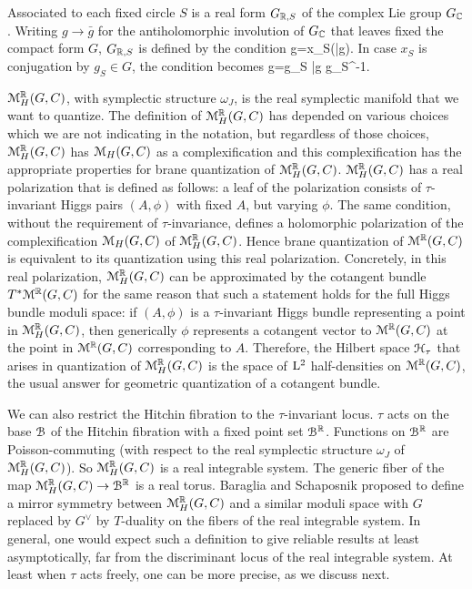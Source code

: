 \documentclass[11pt,a4paper]{article}
\begin{document}
  Associated to each fixed circle $S$ is a real form $G_{{\mathbb{R}},S}$ of the complex Lie group $G_{\mathbb C}$.   Writing $g\to \bar g$ for the antiholomorphic
  involution of $G_{\mathbb C}$ that leaves fixed the compact form $G$,  $G_{{\mathbb{R}},S}$ is defined by the condition
  \be\label{ralform} g=x_S(\bar g). \ee
  In case $x_S$ is conjugation by $g_S\in G$, the condition becomes 
  \be\label{realform} g=g_S \bar g g_S^{-1}.\ee

${\mathcal M}_H^{\mathbb{R}}(G,C)$, with symplectic structure $\omega_J$, is the real symplectic manifold  that we want to quantize.  The definition of  ${\mathcal M}_H^{\mathbb{R}}(G,C)$ has
depended on various choices which we are not indicating in the notation, but regardless of those choices, ${\mathcal M}_H^{\mathbb{R}}(G,C)$ has  ${\mathcal M}_H(G,C)$  as a complexification
and this complexification has the appropriate properties for brane quantization of ${\mathcal M}_H^{\mathbb{R}}(G,C)$.
${\mathcal M}_H^{\mathbb{R}}(G,C)$ has a real polarization that is defined
as follows: a leaf of the polarization consists of $\tau$-invariant Higgs pairs $(A,\phi)$ with fixed $A$, but varying $\phi$.   The same condition, without
the requirement of $\tau$-invariance, defines a holomorphic polarization of the complexification ${\mathcal M}_H(G,C)$ of ${\mathcal M}^{\mathbb{R}}_H(G,C)$.  Hence brane quantization
of ${\mathcal M}^{\mathbb{R}}(G,C)$ is equivalent to its quantization using this real polarization.   
Concretely, in this real polarization, ${\mathcal M}_H^{\mathbb{R}}(G,C)$ can be approximated by the cotangent bundle $T^*{\mathcal M}^{\mathbb{R}}(G,C)$
for the same reason that such a statement holds for the full Higgs bundle moduli space: if $(A,\phi)$ is a $\tau$-invariant
Higgs bundle representing a point in ${\mathcal M}_H^{\mathbb{R}}(G,C)$, then generically $\phi$ represents a cotangent vector to ${\mathcal M}^{\mathbb{R}}(G,C)$ at the point in ${\mathcal M}^{\mathbb{R}}(G,C)$
corresponding to $A$.   
Therefore, the Hilbert space ${\mathcal H}_\tau$ that arises in quantization of ${\mathcal M}^{\mathbb{R}}_H(G,C)$ is the space of ${\mathrm L}^2$ half-densities on ${\mathcal M}^{\mathbb{R}}(G,C)$,
the usual answer for geometric quantization of a cotangent bundle.   

We can also restrict the Hitchin fibration to the $\tau$-invariant locus.   $\tau$ acts on the base ${{\mathcal B}}$ of the Hitchin fibration with a fixed point
set ${{\mathcal B}}^{\mathbb{R}}$. Functions on ${{\mathcal B}}^{\mathbb{R}}$ are Poisson-commuting (with respect to the real symplectic structure $\omega_J$ of ${\mathcal M}_H^{\mathbb{R}}(G,C)$).  
So ${\mathcal M}_H^{\mathbb{R}}(G,C)$ is a  real integrable system.
The generic fiber of the map ${\mathcal M}_H^{\mathbb{R}}(G,C)\to {{\mathcal B}}^{\mathbb{R}}$ is a real torus.   
Baraglia and Schaposnik \cite{BaSc} proposed to define a mirror symmetry between ${\mathcal M}_H^{\mathbb{R}}(G,C)$ and a similar moduli space with $G$ replaced by
$G^\vee$ by $T$-duality on the fibers of the
real integrable system.   In general, one would expect such a definition to give reliable results at least asymptotically, far from the discriminant locus of the
real integrable system.  At least when $\tau$ acts freely, one can be more precise, as we discuss next. 
\end{document}
